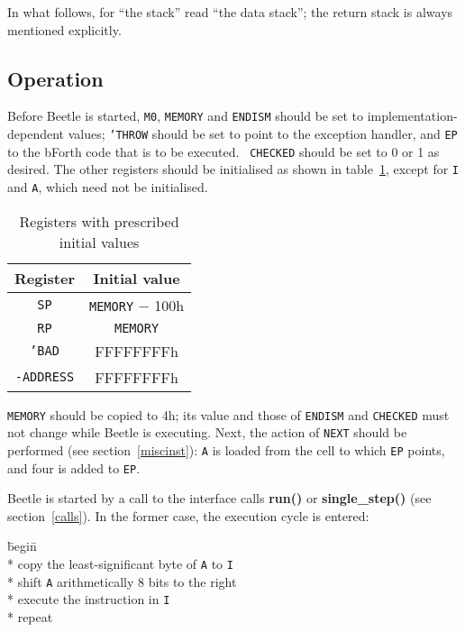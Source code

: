 \documentclass{article}
\begin{document}
In what follows, for ``the stack'' read ``the data stack''; the return stack is
always mentioned explicitly.


\subsection{Operation}
\label{operation}

Before Beetle is started, {\tt M0}, {\tt MEMORY} and {\tt ENDISM} should be set
to implementation-dependent values; {\tt 'THROW} should be set to point to the
exception handler, and {\tt EP} to the bForth code that is to be executed. {\tt
CHECKED} should be set to 0 or 1 as desired. The other registers should be
initialised as shown in table~\ref{inittable}, except for {\tt I} and {\tt A},
which need not be initialised.

\begin{table}[htbp]
\begin{center}
\begin{tabular}{|c|c|} \hline
\rule[-2mm]{0mm}{6mm}\bf Register & \bf Initial value \\ \hline
{\tt SP} & {\tt MEMORY} $-$ 100h \\
{\tt RP} & {\tt MEMORY} \\
{\tt 'BAD} & {FFFFFFFFh} \\
{\tt -ADDRESS} & {FFFFFFFFh} \\ \hline
\end{tabular}
\end{center}
\vspace{-2mm}
\caption{\label{inittable}Registers with prescribed initial values}
\end{table}

{\tt MEMORY} should be copied to 4h; its value and those of {\tt ENDISM} and
{\tt CHECKED} must not change while Beetle is executing. Next, the action of
{\tt NEXT} should be performed (see section~\ref{miscinst}): {\tt A} is loaded
from the cell to which {\tt EP} points, and four is added to {\tt EP}.

Beetle is started by a call to the interface calls {\bf run()} or {\bf
single\_step()} (see section~\ref{calls}). In the former case, the execution
cycle is entered:

\begin{tabbing}
\hspace{0.5in}\=begin\=\+\+ \\*
copy the least-significant byte of {\tt A} to {\tt I} \\*
shift {\tt A} arithmetically 8 bits to the right \\*
execute the instruction in {\tt I} \- \\*
repeat
\end{tabbing}
\end{document}
